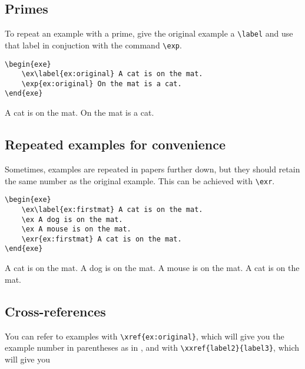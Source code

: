 \documentclass[output=guidelines]{langscibook}
\newcommand{\cmd}[1]{\texttt{\textbackslash#1}}
\begin{document}
\subsection{Primes}
To repeat an example with a prime, give the original example a \cmd{label} and use that label in conjuction with the command \cmd{exp}.

\noindent
\begin{minipage}{.67\textwidth}
\begin{lstlisting}
\begin{exe}
    \ex\label{ex:original} A cat is on the mat.
    \exp{ex:original} On the mat is a cat.
\end{exe}
 \end{lstlisting}
\end{minipage}
\parbox{.33\textwidth}{
\begin{exe}
    \ex \label{ex:original} A cat is on the mat.
     On the mat is a cat.
\end{exe}
}

\subsection{Repeated examples for convenience}
Sometimes, examples are repeated in papers further down, but they should retain the same number as the original example. This can be achieved with \cmd{exr}.


\noindent
\begin{minipage}{.55\textwidth}
\begin{lstlisting}
\begin{exe}
    \ex\label{ex:firstmat} A cat is on the mat. 
    \ex A dog is on the mat. 
    \ex A mouse is on the mat. 
    \exr{ex:firstmat} A cat is on the mat. 
\end{exe}
 \end{lstlisting}
\end{minipage}
\parbox{.45\textwidth}{
\begin{exe}
    \ex\label{ex:firstmat} A cat is on the mat. 
    \ex A dog is on the mat. 
    \ex A mouse is on the mat. 
     A cat is on the mat. 
\end{exe}
}


\subsection{Cross-references}
You can refer to examples with \cmd{xref\{ex:original\}}, which will give you the example number in parentheses as in , and with \cmd{xxref\{label2\}\{label3\}}, which will give you 
\end{document}
